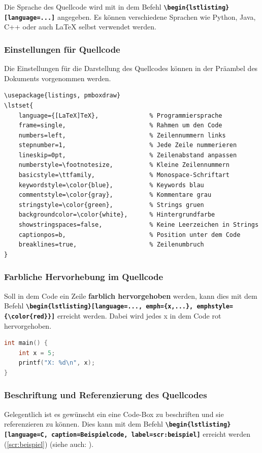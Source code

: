 Die Sprache des Quellcode wird mit in dem Befehl \textbf{\texttt{\textbackslash begin\{lstlisting\}[language=...]}} angegeben. Es können verschiedene Sprachen wie Python, Java, C++ oder auch \LaTeX{} selbst verwendet werden.

\subsubsection{Einstellungen für Quellcode}
Die Einstellungen für die Darstellung des Quellcodes können in der Präambel des Dokuments vorgenommen werden.

\begin{lstlisting}[language={[LaTeX]TeX}]
\usepackage{listings, pmboxdraw}
\lstset{
    language={[LaTeX]TeX},              % Programmiersprache
    frame=single,                       % Rahmen um den Code
    numbers=left,                       % Zeilennummern links
    stepnumber=1,                       % Jede Zeile nummerieren
    lineskip=0pt,                       % Zeilenabstand anpassen
    numberstyle=\footnotesize,          % Kleine Zeilennummern
    basicstyle=\ttfamily,               % Monospace-Schriftart
    keywordstyle=\color{blue},          % Keywords blau
    commentstyle=\color{gray},          % Kommentare grau
    stringstyle=\color{green},          % Strings gruen
    backgroundcolor=\color{white},      % Hintergrundfarbe
    showstringspaces=false,             % Keine Leerzeichen in Strings
    captionpos=b,                       % Position unter dem Code 
    breaklines=true,                    % Zeilenumbruch
}
\end{lstlisting}

\subsubsection{Farbliche Hervorhebung im Quellcode}
Soll in dem Code ein Zeile \textbf{farblich hervorgehoben} werden, kann dies mit dem Befehl \textbf{\texttt{\textbackslash begin\{lstlisting\}[language=..., emph=\{x,...\}, emphstyle=\{\textbackslash color\{red\}\}]}} erreicht werden. Dabei wird jedes x in dem Code rot hervorgehoben.

\begin{lstlisting}[language=C, emph={x}, emphstyle=\color{red}]
int main() {
    int x = 5;
    printf("X: %d\n", x);
}
\end{lstlisting}

\subsubsection{Beschriftung und Referenzierung des Quellcodes}
Gelegentlich ist es gewünscht ein eine Code-Box zu beschriften und sie referenzieren zu können. Dies kann mit dem Befehl \textbf{\texttt{\textbackslash begin\{lstlisting\}[language=C, caption=Beispielcode, label=scr:beispiel]}} erreicht werden (\autoref{scr:beispiel}) (siehe auch: ).

